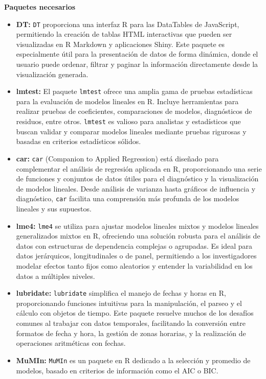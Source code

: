 \documentclass[
  11pt,
  bookmarksnumbered]{article}
\begin{document}
\textbf{Paquetes necesarios}

\begin{itemize}
\item
  \textbf{DT:} \texttt{DT} proporciona una interfaz R para las DataTables de JavaScript, permitiendo la creación de tablas HTML interactivas que pueden ser visualizadas en R Markdown y aplicaciones Shiny.
  Este paquete es especialmente útil para la presentación de datos de forma dinámica, donde el usuario puede ordenar, filtrar y paginar la información directamente desde la visualización generada.
\item
  \textbf{lmtest:} El paquete \texttt{lmtest} ofrece una amplia gama de pruebas estadísticas para la evaluación de modelos lineales en R.
  Incluye herramientas para realizar pruebas de coeficientes, comparaciones de modelos, diagnósticos de residuos, entre otros.
  \texttt{lmtest} es valioso para analistas y estadísticos que buscan validar y comparar modelos lineales mediante pruebas rigurosas y basadas en criterios estadísticos sólidos.
\item
  \textbf{car:} \texttt{car} (Companion to Applied Regression) está diseñado para complementar el análisis de regresión aplicada en R, proporcionando una serie de funciones y conjuntos de datos útiles para el diagnóstico y la visualización de modelos lineales.
  Desde análisis de varianza hasta gráficos de influencia y diagnóstico, \texttt{car} facilita una comprensión más profunda de los modelos lineales y sus supuestos.
\item
  \textbf{lme4:} \texttt{lme4} se utiliza para ajustar modelos lineales mixtos y modelos lineales generalizados mixtos en R, ofreciendo una solución robusta para el análisis de datos con estructuras de dependencia complejas o agrupadas.
  Es ideal para datos jerárquicos, longitudinales o de panel, permitiendo a los investigadores modelar efectos tanto fijos como aleatorios y entender la variabilidad en los datos a múltiples niveles.
\item
  \textbf{lubridate:} \texttt{lubridate} simplifica el manejo de fechas y horas en R, proporcionando funciones intuitivas para la manipulación, el parseo y el cálculo con objetos de tiempo.
  Este paquete resuelve muchos de los desafíos comunes al trabajar con datos temporales, facilitando la conversión entre formatos de fecha y hora, la gestión de zonas horarias, y la realización de operaciones aritméticas con fechas.
\item
  \textbf{MuMIn:} \texttt{MuMIn} es un paquete en R dedicado a la selección y promedio de modelos, basado en criterios de información como el AIC o BIC.

\end{itemize}
\end{document}
